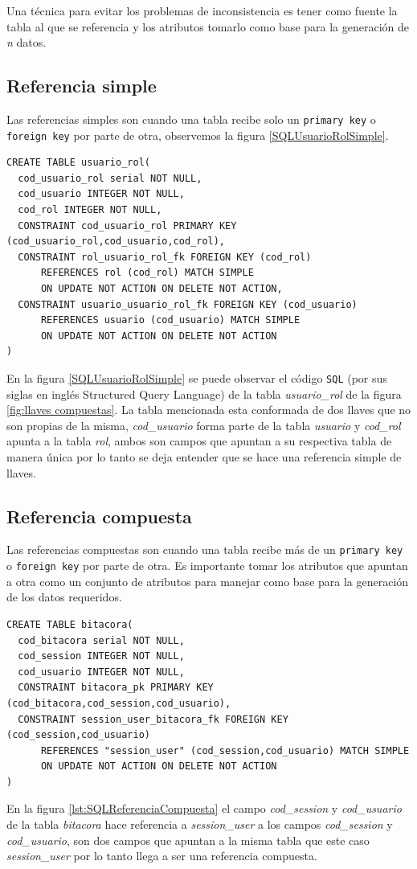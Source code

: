 Una t\'ecnica para evitar los problemas de inconsistencia es tener como fuente la tabla al que se referencia y los atributos  tomarlo como base para la generaci\'on de \emph{n} datos.
\subsection{Referencia simple}
Las referencias simples son cuando una tabla recibe solo un \texttt{primary key} o \texttt{foreign key} por parte de otra, observemos la figura \ref{SQLUsuarioRolSimple}.
\lstset{language=sql,breaklines=true}
\label{SQLUsuarioRolSimple}
\begin{lstlisting}
CREATE TABLE usuario_rol(
  cod_usuario_rol serial NOT NULL,
  cod_usuario INTEGER NOT NULL,
  cod_rol INTEGER NOT NULL,
  CONSTRAINT cod_usuario_rol PRIMARY KEY (cod_usuario_rol,cod_usuario,cod_rol),
  CONSTRAINT rol_usuario_rol_fk FOREIGN KEY (cod_rol)
      REFERENCES rol (cod_rol) MATCH SIMPLE
      ON UPDATE NOT ACTION ON DELETE NOT ACTION,
  CONSTRAINT usuario_usuario_rol_fk FOREIGN KEY (cod_usuario)
      REFERENCES usuario (cod_usuario) MATCH SIMPLE
      ON UPDATE NOT ACTION ON DELETE NOT ACTION
)
\end{lstlisting}
En la figura \ref{SQLUsuarioRolSimple} se puede observar el c\'odigo  \texttt{SQL} (por sus siglas en ingl\'es Structured Query Language) de la tabla \textit{usuario\_rol} de la figura \ref{fig:llaves compuestas}.  La tabla mencionada esta conformada de dos llaves que no son propias de la misma, \textit{cod\_usuario} forma parte de la tabla \textit{usuario} y \textit{cod\_rol} apunta a la tabla \textit{rol}, ambos son campos que apuntan a su respectiva tabla de manera \'unica por lo tanto se deja entender que se hace una referencia simple de llaves.
\subsection{Referencia compuesta}
Las referencias compuestas son cuando una tabla recibe m\'as de un \texttt{primary key} o \texttt{foreign key} por parte de otra. Es importante tomar los atributos que apuntan a otra como un conjunto de atributos para manejar como base para la generaci\'on de los datos requeridos.
\lstset{language=sql,breaklines=true}
\label{lst:SQLReferenciaCompuesta}
\begin{lstlisting}
CREATE TABLE bitacora(
  cod_bitacora serial NOT NULL,
  cod_session INTEGER NOT NULL,
  cod_usuario INTEGER NOT NULL,	  
  CONSTRAINT bitacora_pk PRIMARY KEY (cod_bitacora,cod_session,cod_usuario),
  CONSTRAINT session_user_bitacora_fk FOREIGN KEY (cod_session,cod_usuario)
      REFERENCES "session_user" (cod_session,cod_usuario) MATCH SIMPLE
      ON UPDATE NOT ACTION ON DELETE NOT ACTION
)
\end{lstlisting}
En la figura \ref{lst:SQLReferenciaCompuesta} el campo \textit{cod\_session} y \textit{cod\_usuario} de la tabla \textit{bitacora} hace referencia a \textit{session\_user} a los campos \textit{cod\_session} y \textit{cod\_usuario}, son dos campos que apuntan a la misma tabla que este caso \textit{session\_user} por lo tanto llega a ser una referencia compuesta.